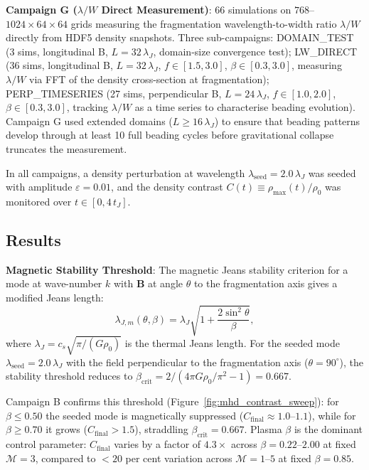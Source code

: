 \documentclass[usenatbib]{rasti}
\begin{document}
\textbf{Campaign G ($\lambda/W$ Direct Measurement)}: 66 simulations on $768$--$1024 \times
64 \times 64$ grids measuring the fragmentation wavelength-to-width ratio $\lambda/W$ directly
from HDF5 density snapshots. Three sub-campaigns: DOMAIN\_TEST (3 sims, longitudinal B,
$L = 32\,\lambda_J$, domain-size convergence test); LW\_DIRECT (36 sims, longitudinal B,
$L = 32\,\lambda_J$, $f \in [1.5, 3.0]$, $\beta \in [0.3, 3.0]$, measuring $\lambda/W$ via
FFT of the density cross-section at fragmentation); PERP\_TIMESERIES (27 sims, perpendicular
B, $L = 24\,\lambda_J$, $f \in [1.0, 2.0]$, $\beta \in [0.3, 3.0]$, tracking $\lambda/W$ as
a time series to characterise beading evolution). Campaign G used extended domains
($L \geq 16\,\lambda_J$) to ensure that beading patterns develop through at least 10 full
beading cycles before gravitational collapse truncates the measurement.

In all campaigns, a density perturbation at wavelength $\lambda_\mathrm{seed} = 2.0\,\lambda_J$
was seeded with amplitude $\varepsilon = 0.01$, and the density contrast $C(t) \equiv
\rho_\mathrm{max}(t)/\rho_0$ was monitored over $t \in [0, 4\,t_J]$.

\subsection{Results}
\label{sec:tc7_results}

\textbf{Magnetic Stability Threshold}: The magnetic Jeans stability criterion for a mode at
wave-number $k$ with $\mathbf{B}$ at angle $\theta$ to the fragmentation axis gives a
modified Jeans length:
\begin{equation}
\lambda_{J,m}(\theta,\beta) = \lambda_J \sqrt{1 + \frac{2\sin^2\theta}{\beta}},
\label{eq:magnetic_jeans}
\end{equation}
where $\lambda_J = c_s\sqrt{\pi/(G\rho_0)}$ is the thermal Jeans length. For the seeded
mode $\lambda_\mathrm{seed} = 2.0\,\lambda_J$ with the field perpendicular to the
fragmentation axis ($\theta = 90^\circ$), the stability threshold reduces to $\beta_\mathrm{crit}
= 2/(4\pi G\rho_0/\pi^2 - 1) = 0.667$.

Campaign B confirms this threshold (Figure~\ref{fig:mhd_contrast_sweep}): for $\beta \leq 0.50$
the seeded mode is magnetically suppressed ($C_\mathrm{final} \approx 1.0$--$1.1$), while for
$\beta \geq 0.70$ it grows ($C_\mathrm{final} > 1.5$), straddling $\beta_\mathrm{crit} = 0.667$.
Plasma $\beta$ is the dominant control parameter: $C_\mathrm{final}$ varies by a factor of
$4.3\times$ across $\beta = 0.22$--$2.00$ at fixed $\mathcal{M}=3$, compared to $<20$ per cent
variation across $\mathcal{M} = 1$--$5$ at fixed $\beta = 0.85$.
\end{document}
